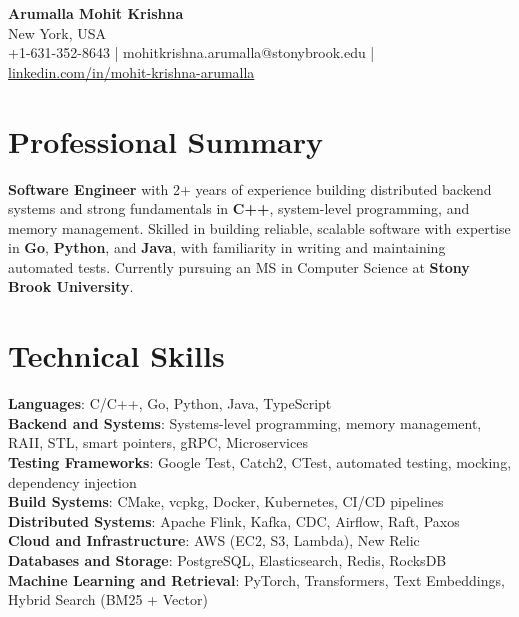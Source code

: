\documentclass[letterpaper,11pt]{article}
\begin{document}
\begin{center}
  {\Large \textbf{Arumalla Mohit Krishna}} \\
  New York, USA \\
  +1-631-352-8643 \enspace | \enspace mohitkrishna.arumalla@stonybrook.edu \enspace | \enspace \href{https://www.linkedin.com/in/mohit-krishna-arumalla}{linkedin.com/in/mohit-krishna-arumalla}
\end{center}

\section{Professional Summary}
  \begin{itemize}[leftmargin=0.15in, label={}]
    \small{\item{
     \textbf{Software Engineer} with 2+ years of experience building distributed backend systems and strong fundamentals in \textbf{C++}, system-level programming, and memory management. Skilled in building reliable, scalable software with expertise in \textbf{Go}, \textbf{Python}, and \textbf{Java}, with familiarity in writing and maintaining automated tests. Currently pursuing an MS in Computer Science at \textbf{Stony Brook University}.
    }}
  \end{itemize}
\vspace{-16pt}

\section{Technical Skills}
 \begin{itemize}[leftmargin=0.15in, label={}]
    \small{\item{
     \textbf{Languages}: C/C++, Go, Python, Java, TypeScript \\
     \textbf{Backend and Systems}: Systems-level programming, memory management, RAII, STL, smart pointers, gRPC, Microservices \\
     \textbf{Testing Frameworks}: Google Test, Catch2, CTest, automated testing, mocking, dependency injection\\
     \textbf{Build Systems}: CMake, vcpkg, Docker, Kubernetes, CI/CD pipelines \\
     \textbf{Distributed Systems}: Apache Flink, Kafka, CDC, Airflow, Raft, Paxos \\
     \textbf{Cloud and Infrastructure}: AWS (EC2, S3, Lambda), New Relic \\
     \textbf{Databases and Storage}: PostgreSQL, Elasticsearch, Redis, RocksDB \\
     \textbf{Machine Learning and Retrieval}: PyTorch, Transformers, Text Embeddings, Hybrid Search (BM25 + Vector)
    }}
 \end{itemize}
\vspace{-16pt}
\end{document}
